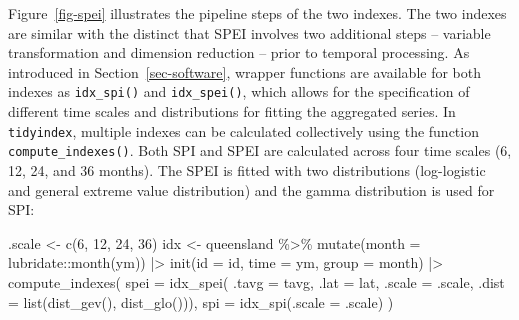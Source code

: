 \documentclass[
]{interact}
\newenvironment{Shaded}{\begin{snugshade}}{\end{snugshade}}
\newcommand{\AttributeTok}[1]{\textcolor[rgb]{0.40,0.45,0.13}{#1}}
\newcommand{\DecValTok}[1]{\textcolor[rgb]{0.68,0.00,0.00}{#1}}
\newcommand{\FunctionTok}[1]{\textcolor[rgb]{0.28,0.35,0.67}{#1}}
\newcommand{\NormalTok}[1]{\textcolor[rgb]{0.00,0.23,0.31}{#1}}
\newcommand{\OtherTok}[1]{\textcolor[rgb]{0.00,0.23,0.31}{#1}}
\newcommand{\SpecialCharTok}[1]{\textcolor[rgb]{0.37,0.37,0.37}{#1}}
\begin{document}
Figure~\ref{fig-spei} illustrates the pipeline steps of the two indexes.
The two indexes are similar with the distinct that SPEI involves two
additional steps -- variable transformation and dimension reduction --
prior to temporal processing. As introduced in
Section~\ref{sec-software}, wrapper functions are available for both
indexes as \texttt{idx\_spi()} and \texttt{idx\_spei()}, which allows
for the specification of different time scales and distributions for
fitting the aggregated series. In \texttt{tidyindex}, multiple indexes
can be calculated collectively using the function
\texttt{compute\_indexes()}. Both SPI and SPEI are calculated across
four time scales (6, 12, 24, and 36 months). The SPEI is fitted with two
distributions (log-logistic and general extreme value distribution) and
the gamma distribution is used for SPI:

\begin{Shaded}
\begin{Highlighting}[]
\NormalTok{.scale }\OtherTok{\textless{}{-}} \FunctionTok{c}\NormalTok{(}\DecValTok{6}\NormalTok{, }\DecValTok{12}\NormalTok{, }\DecValTok{24}\NormalTok{, }\DecValTok{36}\NormalTok{)}
\NormalTok{idx }\OtherTok{\textless{}{-}}\NormalTok{ queensland }\SpecialCharTok{\%\textgreater{}\%}
  \FunctionTok{mutate}\NormalTok{(}\AttributeTok{month =}\NormalTok{ lubridate}\SpecialCharTok{::}\FunctionTok{month}\NormalTok{(ym)) }\SpecialCharTok{|\textgreater{}}
  \FunctionTok{init}\NormalTok{(}\AttributeTok{id =}\NormalTok{ id, }\AttributeTok{time =}\NormalTok{ ym, }\AttributeTok{group =}\NormalTok{ month) }\SpecialCharTok{|\textgreater{}} 
  \FunctionTok{compute\_indexes}\NormalTok{(}
    \AttributeTok{spei =} \FunctionTok{idx\_spei}\NormalTok{(}
      \AttributeTok{.tavg =}\NormalTok{ tavg, }\AttributeTok{.lat =}\NormalTok{ lat, }
      \AttributeTok{.scale =}\NormalTok{ .scale, }\AttributeTok{.dist =} \FunctionTok{list}\NormalTok{(}\FunctionTok{dist\_gev}\NormalTok{(), }\FunctionTok{dist\_glo}\NormalTok{())),}
    \AttributeTok{spi =} \FunctionTok{idx\_spi}\NormalTok{(}\AttributeTok{.scale =}\NormalTok{ .scale)}
\NormalTok{  )}
\end{Highlighting}
\end{Shaded}
\end{document}
